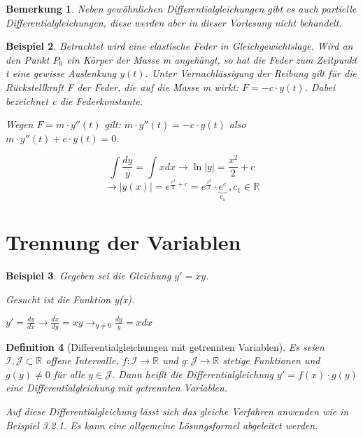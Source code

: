 \documentclass[12pt,a4paper]{scrreprt}
\newtheorem{defi}{Definition}[section]
\newtheorem{bemerkung}[defi]{Bemerkung}
\newtheorem{beispiel}[defi]{Beispiel}
\begin{document}
	\begin{bemerkung}
		Neben gewöhnlichen Differentialgleichungen gibt es auch partielle Differentialgleichungen, diese werden aber in dieser Vorlesung nicht behandelt.
	\end{bemerkung}

	\begin{beispiel}
		Betrachtet wird eine elastische Feder in Gleichgewichtslage. Wird an den Punkt $P_0$ ein Körper der Masse m angehängt, so hat die Feder zum Zeitpunkt t eine gewisse Auslenkung $y(t)$. Unter Vernachlässigung der Reibung gilt für die Rückstellkraft F der Feder, die auf die Masse m wirkt: $F=-c \cdot y(t)$. Dabei bezeichnet c die Federkonstante.

		Wegen $F=m \cdot y''(t)$ gilt: $m \cdot y''(t)=-c \cdot y(t)$ also $m \cdot y''(t) + c \cdot y(t) = 0$.

		\[\int\frac{dy}{y}=\int xdx \to \ln\left|y\right| = \frac{x^2}{2}+c \]
		\[\to |y(x)| = e^{\frac{x^2}{2}+c}=e^{\frac{x^2}{2}}\cdot \underbrace{e^c}_{c_1}\ ,c_1\in\mathbb{R}\]
	\end{beispiel}

	\section{Trennung der Variablen}
	\begin{beispiel}
		Gegeben sei die Gleichung $y'=xy$.

		Gesucht ist die Funktion y(x).

		$y'=\frac{dy}{dx} \to \frac{dx}{dy}=xy \to_{y \ne 0} \frac{dy}{y}=xdx$
	\end{beispiel}

	\begin{defi}[Differentialgleichungen mit getrennten Variablen]
		Es seien $\mathcal{I},\mathcal{J}\subset\mathbb{R}$ offene Intervalle, $f:\mathcal{I}\to\mathbb{R}$ und $g:\mathcal{J}\to\mathbb{R}$ stetige Funktionen und $g(y)\ne0$ für alle $y\in\mathcal{J}$. Dann heißt die Differentialgleichung $y'=f(x)\cdot g(y)$ eine Differentialgleichung mit getrennten Variablen.

		Auf diese Differentialgleichung lässt sich das gleiche Verfahren anwenden wie in Beispiel 3.2.1. Es kann eine allgemeine Lösungsformel abgeleitet werden.
	\end{defi}
\end{document}
